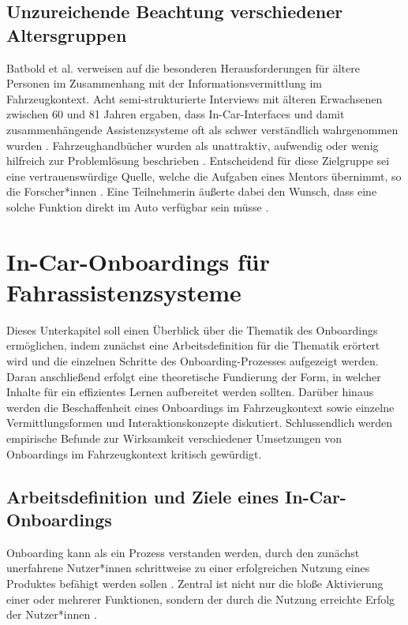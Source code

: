 \subsection{Unzureichende Beachtung verschiedener Altersgruppen}
\label{subsec:altersgruppen}
Batbold et al. \cite{batbold2024mentorable} verweisen auf die besonderen Herausforderungen für ältere Personen im Zusammenhang mit der Informationsvermittlung im Fahrzeugkontext. Acht semi-strukturierte Interviews mit älteren Erwachsenen zwischen 60 und 81 Jahren ergaben, dass In-Car-Interfaces und damit zusammenhängende Assistenzsysteme oft als schwer verständlich wahrgenommen wurden \cite{batbold2024mentorable}. Fahrzeughandbücher wurden als unattraktiv, aufwendig oder wenig hilfreich zur Problemlösung beschrieben \cite{batbold2024mentorable}. Entscheidend für diese Zielgruppe sei eine vertrauenswürdige Quelle, welche die Aufgaben eines Mentors übernimmt, so die Forscher*innen \cite{batbold2024mentorable}. Eine Teilnehmerin äußerte dabei den Wunsch, dass eine solche Funktion direkt im Auto verfügbar sein müsse \cite{batbold2024mentorable}. 


\section{In-Car-Onboardings für Fahrassistenzsysteme}
\label{sec:training_onboarding}
Dieses Unterkapitel soll einen Überblick über die Thematik des Onboardings ermöglichen, indem zunächst eine Arbeitsdefinition für die Thematik erörtert wird und die einzelnen Schritte des Onboarding-Prozesses aufgezeigt werden. Daran anschließend erfolgt eine theoretische Fundierung der Form, in welcher Inhalte für ein effizientes Lernen aufbereitet werden sollten. Darüber hinaus werden die Beschaffenheit eines Onboardings im Fahrzeugkontext sowie einzelne Vermittlungsformen und Interaktionskonzepte diskutiert. Schlussendlich werden empirische Befunde zur Wirksamkeit verschiedener Umsetzungen von Onboardings im Fahrzeugkontext kritisch gewürdigt.

\subsection{Arbeitsdefinition und Ziele eines In-Car-Onboardings}
\label{subsec:onboarding_begriff}
Onboarding kann als ein Prozess verstanden werden, durch den zunächst unerfahrene Nutzer*innen schrittweise zu einer erfolgreichen Nutzung eines Produktes befähigt werden sollen \cite{hulick2014elements}. Zentral ist nicht nur die bloße Aktivierung einer oder mehrerer Funktionen, sondern der durch die Nutzung erreichte Erfolg der Nutzer*innen \cite{hulick2014elements}.

